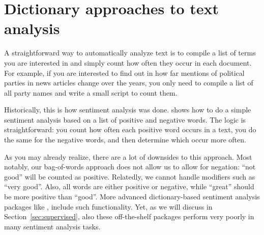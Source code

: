 \section{Dictionary approaches to text analysis}
\label{sec:dictionary}

A straightforward way to automatically analyze text is to compile a
list of terms you are interested in and simply count how often they
occur in each document. For example, if you are interested to find out
in how far mentions of political parties in news articles change over
the years, you only need to compile a list of all party names and
write a small script to count them.

Historically, this is how sentiment analysis was
done.  shows how to do a simple sentiment analysis
based on a list of positive and negative words. The logic is
straightforward: you count how often each positive word occurs in a
text, you do the same for the negative words, and then determine which
occur more often.




As you may already realize, there are a lot of downsides to this
approach. Most notably, our bag-of-words approach does not allow us to
allow for negation: ``not good'' will be counted as
positive. Relatedly, we cannot handle modifiers such as ``very
good''. Also, all words are either positive or negative, while
``great'' should be more positive than ``good''. More advanced
dictionary-based sentiment analysis packages like \cite{vader},
\cite{sentistrength} include such functionality. Yet, as we will
discuss in Section~\ref{sec:supervised}, also these off-the-shelf
packages perform very poorly in many sentiment analysis tasks.

